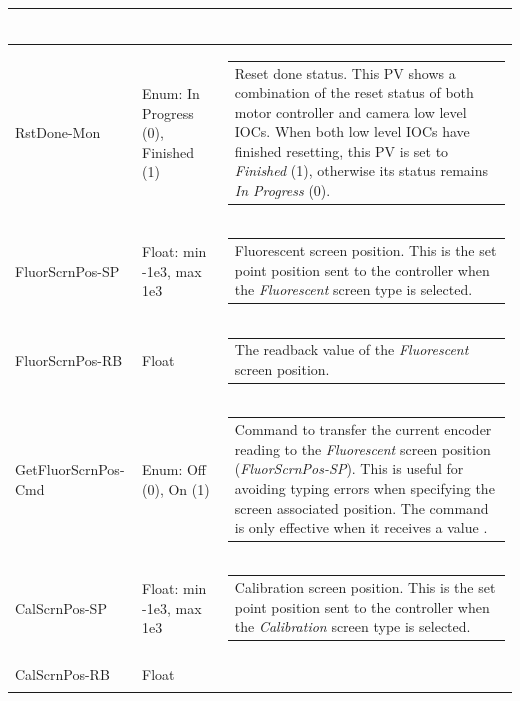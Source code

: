 \documentclass[openany]{article}
\begin{document}
\begin{longtable}{| m{4.5cm} m{2.5cm}  m{7.0cm} |}
\begin{tabular}{@{}m{6cm}@{}}
            \end{tabular} \hypertarget{pv:rst-done-mon}{}\\ \hline
        RstDone-Mon & Enum: In Progress (0), Finished (1) & \begin{tabular}{@{}m{6cm}@{}}
                Reset done status. This PV shows a combination of the reset status of both motor controller and camera low level IOCs. When both low level IOCs have finished resetting, this PV is set to \emph{Finished} (1), otherwise its status remains \emph{In Progress} (0).
            \end{tabular} \hypertarget{pv:fluor-scrn-pos}{}\\ \hline
        FluorScrnPos-SP & Float: min -1e3, max 1e3 & \begin{tabular}{@{}m{6cm}@{}}
                Fluorescent screen position. This is the set point position sent to the controller when the \emph{Fluorescent} screen type is selected.
            \end{tabular} \hypertarget{}{}\\ \hline
        FluorScrnPos-RB & Float & \begin{tabular}{@{}m{6cm}@{}}
                The readback value of the \emph{Fluorescent} screen position.
            \end{tabular} \hypertarget{pv:get-fluor-scrn-pos-cmd}{}\\ \hline
        GetFluorScrnPos-Cmd & Enum: Off (0), On (1) & \begin{tabular}{@{}m{6cm}@{}}
                Command to transfer the current encoder reading to the \emph{Fluorescent} screen position (\emph{FluorScrnPos-SP}). This is useful for avoiding typing errors when specifying the screen associated position. The command is only effective when it receives a value $\neq 0$.
            \end{tabular} \hypertarget{pv:cal-scrn-pos}{}\\ \hline
        CalScrnPos-SP & Float: min -1e3, max 1e3 & \begin{tabular}{@{}m{6cm}@{}}
                Calibration screen position. This is the set point position sent to the controller when the \emph{Calibration} screen type is selected.
            \end{tabular} \hypertarget{}{}\\ \hline
        CalScrnPos-RB & Float & \begin{tabular}{@{}m{6cm}@{}}

\end{tabular}
\end{longtable}
\end{document}

